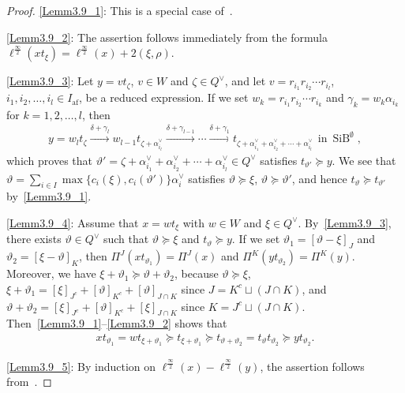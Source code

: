 \documentclass[10pt]{amsart}
\theoremstyle{definition}\newtheorem{defi}[theo]{Definition}
\theoremstyle{remark}\newtheorem{rema}[theo]{Remark}
\newcommand{\si}{\frac{\infty}{2}}
\DeclareMathOperator{\af}{af}
\DeclareMathOperator{\SiB}{SiB}
\begin{document}
\begin{proof}
\ref{Lemm3.9_1}: 
This is a special case of~\cite[Lemma~6.2.1]{INS16}.

\ref{Lemm3.9_2}: 
The assertion follows immediately from the formula 
$\ell^{\si}(x t_{\xi}) = \ell^{\si}(x) + 2(\xi,\rho)$. 

\ref{Lemm3.9_3}: 
Let 
$y = v t_{\zeta}$, 
$v \in W$ 
and 
$\zeta \in Q^{\vee}$, 
and let
$v = r_{i_1} r_{i_2} \cdots r_{i_l}$, 
$i_1 , i_2 , \ldots , i_l \in I_{\af}$, 
be a reduced expression. 
If we set 
$w_k = r_{i_1} r_{i_2} \cdots r_{i_k}$
and 
$\gamma_k = w_k \alpha_{i_k}$
for 
$k = 1,2,\ldots ,l$, then
\begin{align}
y = w_l t_{\zeta} 
\xrightarrow{\delta + \gamma_l} 
w_{l-1} t_{\zeta + \alpha_{i_l}^{\vee}} 
\xrightarrow{\delta + \gamma_{l-1}}
\cdots 
\xrightarrow{\delta + \gamma_1}
t_{\zeta + \alpha_{i_1}^{\vee} + \alpha_{i_2}^{\vee} + \cdots + \alpha_{i_l}^{\vee}}
\ \ 
\text{in}
\ 
\SiB ^{\emptyset}, 
\end{align}
which proves that 
$\vartheta' = \zeta + \alpha_{i_1}^{\vee} + \alpha_{i_2}^{\vee} + \cdots + \alpha_{i_l}^{\vee} \in Q^{\vee}$ 
satisfies 
$t_{\vartheta'} \succeq y$. 
We see that 
$\vartheta = \sum_{i \in I} \max \{ c_i(\xi) , c_i(\vartheta') \} \alpha_i^{\vee}$ 
satisfies 
$\vartheta \succeq \xi$, 
$\vartheta \succeq \vartheta'$, 
and hence 
$t_{\vartheta} \succeq t_{\vartheta'}$
by~\ref{Lemm3.9_1}.

\ref{Lemm3.9_4}: 
Assume that 
$x = wt_{\xi}$
with 
$w \in W$
and 
$\xi \in Q^{\vee}$. 
By~\ref{Lemm3.9_3}, 
there exists 
$\vartheta \in Q^{\vee}$ 
such that 
$\vartheta \succeq \xi$
and 
$t_{\vartheta} \succeq y$. 
If we set 
$\vartheta_1 = [\vartheta - \xi]_J$
and 
$\vartheta_2 =[\xi - \vartheta]_K$, 
then
$\Pi^J(x t_{\vartheta_1}) = \Pi^J(x)$
and 
$\Pi^K(y t_{\vartheta_2}) = \Pi^K(y)$. 
Moreover, we have 
$\xi + \vartheta_1 \succeq \vartheta + \vartheta_2$, 
because 
$\vartheta \succeq \xi$, 
$\xi + \vartheta_1 = [\xi]_{J^c} + [\vartheta]_{K^c} + [\vartheta]_{J \cap K}$
since 
$J = K^c \sqcup (J \cap K)$, and 
$\vartheta + \vartheta_2 = [\xi]_{J^c} + [\vartheta]_{K^c} + [\xi]_{J \cap K}$
since
$K = J^c \sqcup (J \cap K)$. 
Then~\ref{Lemm3.9_1}--\ref{Lemm3.9_2} shows that
\begin{align}
xt_{\vartheta_1} 
=
wt_{\xi + \vartheta_1}
\succeq
t_{\xi + \vartheta_1}
\succeq
t_{\vartheta + \vartheta_2}
=
t_{\vartheta} t_{\vartheta_2}
\succeq
yt_{\vartheta_2}.
\end{align}

\ref{Lemm3.9_5}: 
By induction on $\ell^{\si}(x) - \ell^{\si}(y)$, 
the assertion follows from~\cite[Lemma~6.1.1 for $K = \emptyset$]{INS16}.
\end{proof}
\end{document}
